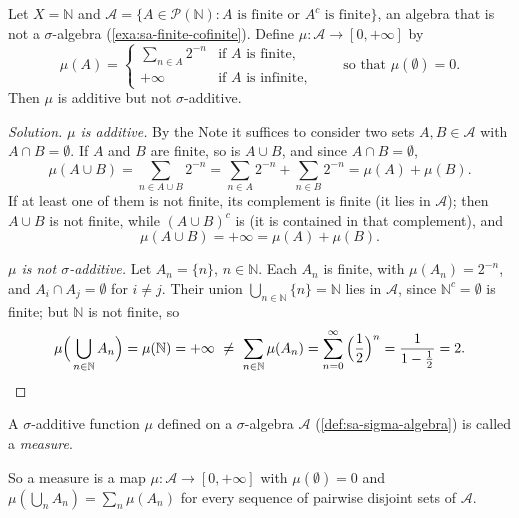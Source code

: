 \begin{example}\label{exa:ms-additive-not-sigma}
Let $X=\mathbb N$ and
$\mathcal A=\{A\in\mathcal P(\mathbb N):A\text{ is finite or }A^c\text{ is finite}\}$, an
algebra that is not a $\sigma$-algebra (\cref{exa:sa-finite-cofinite}). Define
$\mu:\mathcal A\to[0,+\infty]$ by
\[
  \mu(A)=\begin{cases}\displaystyle\sum_{n\in A}2^{-n}&\text{if $A$ is finite},\\[1ex]
  +\infty&\text{if $A$ is infinite},\end{cases}\qquad\text{so that }\mu(\emptyset)=0.
\]
Then $\mu$ is additive but not $\sigma$-additive.
\end{example}

\begin{proof}[Solution]
\emph{$\mu$ is additive.} By the Note it suffices to consider two sets $A,B\in\mathcal A$ with
$A\cap B=\emptyset$. If $A$ and $B$ are finite, so is $A\cup B$, and since $A\cap B=\emptyset$,
\[
  \mu(A\cup B)=\sum_{n\in A\cup B}2^{-n}=\sum_{n\in A}2^{-n}+\sum_{n\in B}2^{-n}=\mu(A)+\mu(B).
\]
If at least one of them is not finite, its complement is finite (it lies in $\mathcal A$); then
$A\cup B$ is not finite, while $(A\cup B)^c$ is (it is contained in that complement), and
\[
  \mu(A\cup B)=+\infty=\mu(A)+\mu(B).
\]

\emph{$\mu$ is not $\sigma$-additive.} Let $A_n=\{n\}$, $n\in\mathbb N$. Each $A_n$ is
finite, with $\mu(A_n)=2^{-n}$, and $A_i\cap A_j=\emptyset$ for $i\ne j$. Their union
$\bigcup_{n\in\mathbb N}\{n\}=\mathbb N$ lies in $\mathcal A$, since $\mathbb N^c=\emptyset$
is finite; but $\mathbb N$ is not finite, so
\[
  \mu\Big(\bigcup_{n\in\mathbb N}A_n\Big)=\mu(\mathbb N)=+\infty\ \ne\ \sum_{n\in\mathbb N}\mu(A_n)
  =\sum_{n=0}^{\infty}\Big(\frac12\Big)^n=\frac{1}{1-\frac12}=2. \qedhere
\]
\end{proof}

\begin{definition}[Measure]\label{def:ms-measure}
A $\sigma$-additive function $\mu$ defined on a $\sigma$-algebra $\mathcal A$
(\cref{def:sa-sigma-algebra}) is called a \emph{measure}.
\end{definition}

So a measure is a map $\mu:\mathcal A\to[0,+\infty]$ with $\mu(\emptyset)=0$ and
$\mu(\bigcup_nA_n)=\sum_n\mu(A_n)$ for every sequence of pairwise disjoint sets of
$\mathcal A$.

